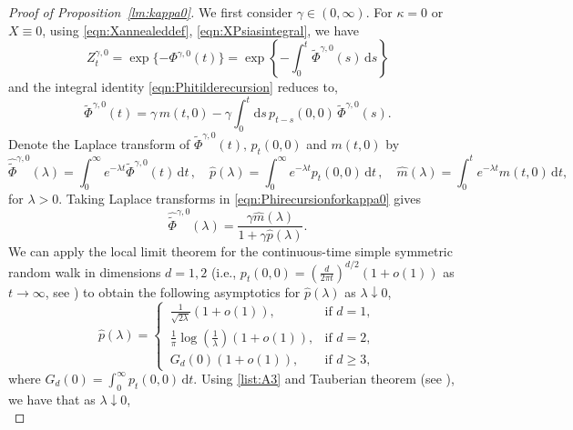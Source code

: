 \documentclass{article}[12pt]
\theoremstyle{definition}
\newcommand{\1}{\mathbbm{1}}
\newcommand{\dd }{\mathrm{d} }
\begin{document}
\begin{proof}[Proof of Proposition~\ref{lm:kappa0}]
We first consider $\gamma \in (0,\infty)$. For $\kappa= 0 $ or $X\equiv 0$, using \eqref{eqn:Xannealeddef}, \eqref{eqn:XPsiasintegral}, we have
$$Z^{\gamma, 0}_t = \exp\{-\Phi^{\gamma,0}(t)\} =  \exp\left\{-\int_{0}^t \tilde{\Phi}^{\gamma,0}(s)\, \dd s\right\}$$
and the integral identity \eqref{eqn:Phitilderecursion} reduces to,
\begin{equation}
    \tilde{\Phi}^{\gamma, 0}(t) = \gamma \,m(t,0) - \gamma \int_{0}^t \dd s\, p_{t-s}(0,0)\,\tilde{\Phi}^{\gamma, 0}(s).
\label{eqn:Phirecursionforkappa0}
\end{equation}
Denote the Laplace transform of $\tilde{\Phi}^{\gamma, 0}(t), \,p_{t}(0,0) $ and $m(t,0)$ by 
\begin{equation}
    \hat{\tilde{\Phi}}^{\gamma, 0}(\lambda)= \int_0^\infty  e^{-\lambda t} \tilde{\Phi}^{\gamma,0}(t)\,\dd t\,,\quad \hat{p}(\lambda) = \int_0^\infty e^{-\lambda t} p_t(0,0)\, \dd t\,, \quad \hat{m}(\lambda) = \int_0^t  e^{-\lambda t} m(t,0)\, \dd t,
\label{eqn:Laplacekappazero}
\end{equation}
for $\lambda>0$. Taking Laplace transforms in \eqref{eqn:Phirecursionforkappa0} gives
\begin{equation}
    \hat{\tilde{\Phi}}^{\gamma,0}(\lambda) = \frac{\gamma\hat{m}(\lambda)}{1+{\gamma}\hat{p}(\lambda)}.
    \label{eqn:PhiHatexpression}
\end{equation}
We can apply the local limit theorem for the continuous-time simple symmetric random walk in dimensions $d=1,2$ (i.e., $p_t(0,0) = \left(\frac{d}{2\pi t}\right)^{d/2}(1+o(1))$ as $t\to \infty$, see \cite[Chapter~II.7, Proposition~9]{S1964}) to obtain the following asymptotics for $\hat{p}(\lambda)$ as $\lambda \downarrow 0$,
\begin{equation}
    \hat{p}(\lambda) = \begin{cases}
   \,\frac{1}{\sqrt{2\lambda}}(1+o(1)), & \text{if } d=1,\\
  \, \frac{1}{\pi}\log \left(\frac{1}{\lambda}\right)(1+o(1)), & \text{if } d=2,\\
   \,G_d(0)(1+o(1)), & \text{if } d\ge 3,
   \end{cases}
   \label{eqn:phatlambda}
\end{equation}
where $G_d(0) = \int_0^\infty p_t(0,0) \,\dd  t$. Using \ref{list:A3} and Tauberian theorem (see \cite[Chapter~XIII.5, Theorem~2]{F1971}), we have that as $\lambda \downarrow 0$,   
\begin{equation}

\end{equation}
\end{proof}
\end{document}
